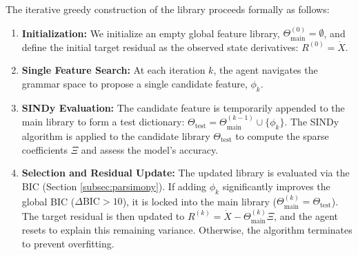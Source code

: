 \documentclass[11pt, a4paper]{article}
\begin{document}
The iterative greedy construction of the library proceeds formally as follows:

\begin{enumerate}
    \item \textbf{Initialization:} We initialize an empty global feature library, $\Theta_{\text{main}}^{(0)} = \emptyset$, and define the initial target residual as the observed state derivatives: $R^{(0)} = \dot{X}$.
    \item \textbf{Single Feature Search:} At each iteration $k$, the agent navigates the grammar space to propose a single candidate feature, $\phi_k$.
    \item \textbf{SINDy Evaluation:} The candidate feature is temporarily appended to the main library to form a test dictionary: $\Theta_{\text{test}} = \Theta_{\text{main}}^{(k-1)} \cup \{\phi_k\}$. The SINDy algorithm is applied to the candidate library $\Theta_{\text{test}}$ to compute the sparse coefficients $\Xi$ and assess the model's accuracy.
    \item \textbf{Selection and Residual Update:} The updated library is evaluated via the BIC (Section \ref{subsec:parsimony}). If adding $\phi_k$ significantly improves the global BIC ($\Delta \text{BIC} > 10$), it is locked into the main library ($\Theta_{\text{main}}^{(k)} = \Theta_{\text{test}}$). The target residual is then updated to $R^{(k)} = \dot{X} - \Theta_{\text{main}}^{(k)}\Xi$, and the agent resets to explain this remaining variance. Otherwise, the algorithm terminates to prevent overfitting.
\end{enumerate}
\end{document}
